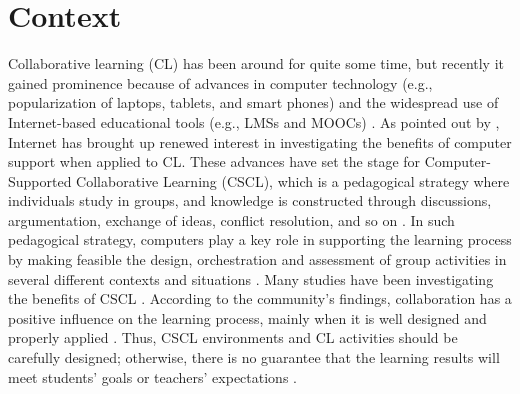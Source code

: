 \section{Context}

Collaborative learning (CL) has been around for quite some time, but recently it gained prominence because of advances in computer technology (e.g., popularization of laptops, tablets, and smart phones) and the widespread use of Internet-based educational tools (e.g., LMSs and MOOCs) \cite{From_mirroring_to_guiding}. As pointed out by , Internet has brought up renewed interest in investigating the benefits of computer support when applied to CL. These advances have set the stage for Computer-Supported Collaborative Learning (CSCL), which is a pedagogical strategy where individuals study in groups, and knowledge is constructed through discussions, argumentation, exchange of ideas, conflict resolution, and so on \cite{CSCL_historical_perspective}. In such pedagogical strategy, computers play a key role in supporting the learning process by making feasible the design, orchestration and assessment of group activities in several different contexts and situations \cite{CSCL_and_Innovation}.
Many studies have been investigating the benefits of CSCL \cite{CSCL_historical_perspective,Collaborative_Learning_Techniques,Theory-Driven_Group_Formation,Designing_for_interaction}. According to the community's findings, collaboration has a positive influence on the learning process, mainly when it is well designed and properly applied \cite{The_pedagogical_challenges_to_collaborative_technologies}. Thus, CSCL environments and CL activities should be carefully designed; otherwise, there is no guarantee that the learning results will meet students’ goals or teachers’ expectations \cite{Why_some_groups_fail,Collaborative_Learning_Techniques}. 

